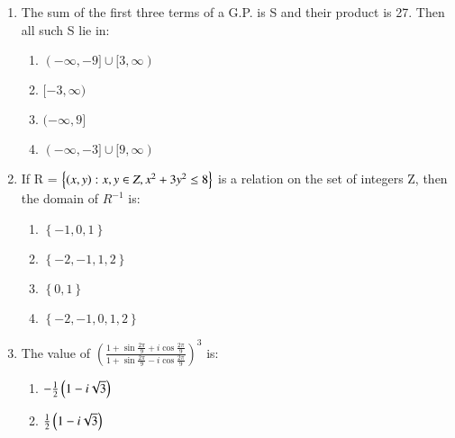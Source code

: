 \documentclass[journal]{IEEEtran}
\numberwithin{equation}{enumi}
\numberwithin{figure}{enumi}
\begin{document}
\begin{enumerate}
    \begin{multicols}{4}
    \begin{enumerate}
        \item $\frac{1}{e^2 - 3e + 13}$
        \item $\frac{e}{e^2 - 3e - 13}$
        \item $\frac{e}{e^2 + 3e + 13}$
        \item $\frac{e}{e^2 - 3e + 13}$
    \end{enumerate} 
    \end{multicols}
    \item The sum of the first three terms of a G.P. is S and their product is 27. Then all such S lie in: \\
    \begin{multicols}{2}
    \begin{enumerate}
        \item $(-\infty,-9]\cup[3,\infty)$
        \item $[-3,\infty)$
        \item $(-\infty,9]$
        \item $(-\infty,-3]\cup[9,\infty)$
    \end{enumerate} 
    \end{multicols}
    \item If R = $\left\{\left(x,y\right) : x,y \in Z , x^2 + 3y^2 \leq 8\right\}$ is a relation on the set of integers Z, then the domain of $R^{-1}$ is: \\
    \begin{multicols}{4}
    \begin{enumerate}
        \item $\left\{-1,0,1\right\}$
        \item $\left\{-2,-1,1,2\right\}$
        \item $\left\{0,1\right\}$
        \item $\left\{-2,-1,0,1,2\right\}$
    \end{enumerate} 
    \end{multicols}
    \item The value of ${\left(\frac{1 + \sin{\frac{2\pi}{9}} + i\cos{\frac{2\pi}{9}}}{1 + \sin{\frac{2\pi}{9}} - i\cos{\frac{2\pi}{9}}}\right)}^3$ is: \\
    \begin{multicols}{4}
    \begin{enumerate}
        \item $-\frac{1}{2}\left(1 - i\sqrt{3}\right)$
        \item $\frac{1}{2}\left(1 - i\sqrt{3}\right)$

\end{enumerate}
\end{multicols}
\end{enumerate}
\end{document}
